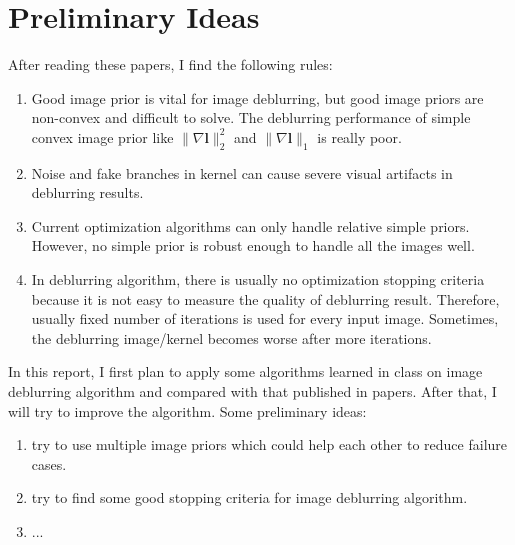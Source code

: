 \documentclass[journal, onecolumn, 10pt]{IEEEtran}
\begin{document}
\section{Preliminary Ideas}
After reading these papers, I find the following rules:
\begin{enumerate}
\item Good image prior is vital for image deblurring, but good image priors are non-convex and difficult to solve. The deblurring performance of simple convex image prior like $\|\nabla \mathbf{l}\|_2^2$ and $\|\nabla \mathbf{l}\|_1$ is really poor.
\item Noise and fake branches in kernel can cause severe visual artifacts in deblurring results.
\item Current optimization algorithms can only handle relative simple priors. However, no simple prior is robust enough to handle all the images well. 
\item In deblurring algorithm, there is usually no optimization stopping criteria because it is not easy to measure the quality of deblurring result. Therefore, usually fixed number of iterations is used for every input image. Sometimes, the deblurring image/kernel becomes worse after more iterations.
\end{enumerate}

In this report, I first plan to apply some algorithms learned in class on image deblurring algorithm and compared with that published in papers. After that, I will try to improve the algorithm. 
Some preliminary ideas:
\begin{enumerate}
\item try to use multiple image priors which could help each other to reduce failure cases.
\item try to find some good stopping criteria for image deblurring algorithm.
\item ...
\end{enumerate}





 
 


\newpage




\end{document}
